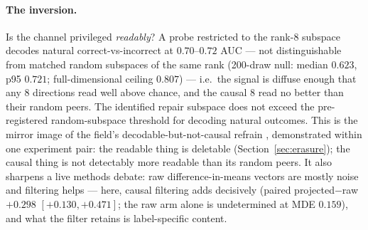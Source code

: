 \documentclass{article} %
\begin{document}
\paragraph{The inversion.} Is the channel privileged \emph{readably}?
A probe restricted to the rank-8 subspace decodes natural
correct-vs-incorrect at $0.70$--$0.72$ AUC --- not distinguishable
from matched random subspaces of the same rank (200-draw null:
median $0.623$, p95 $0.721$; full-dimensional ceiling $0.807$) ---
i.e.\ the signal is diffuse enough that any 8 directions read well
above chance, and the causal 8 read no better than their random
peers.
The identified repair subspace does not exceed the pre-registered
random-subspace threshold for decoding natural outcomes. This is the
mirror image of the field's decodable-but-not-causal refrain
\citep{decodable2026, epiphenomenal2026}, demonstrated within one
experiment pair: the readable thing is deletable
(Section~\ref{sec:erasure}); the causal thing is not detectably more
readable than its random peers. It also
sharpens a live methods debate: raw difference-in-means vectors are
mostly noise and filtering helps \citep{saersv2025} --- here, causal
filtering adds decisively (paired projected$-$raw $+0.298$
$[+0.130, +0.471]$; the raw arm alone is undetermined at MDE
$0.159$), and what
the filter retains is label-specific content.
\end{document}
